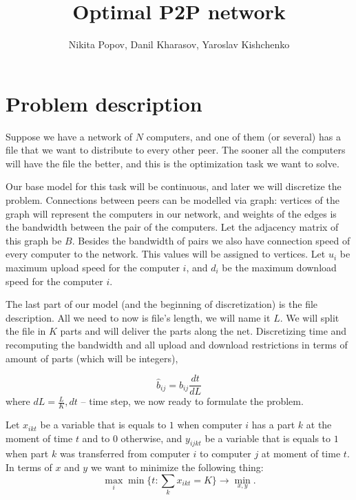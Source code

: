 \documentclass[10pt,a4paper]{article}
\title{Optimal P2P network}
\author{Nikita Popov, Danil Kharasov, Yaroslav Kishchenko}
\begin{document}
\maketitle
\section*{Problem description}

Suppose we have a network of $N$ computers, and one of them (or several) has a file that we want to distribute to every other peer. The sooner all the computers will have the file the better, and this is the optimization task we want to solve. 

Our base model for this task will be continuous, and later we will discretize the problem. Connections between peers can be modelled via graph: vertices of the graph will represent the computers in our network, and weights of the edges is the bandwidth between the pair of the computers. Let the adjacency matrix of this graph be $B$. Besides the bandwidth of pairs we also have connection speed of every computer to the network. This values will be assigned to vertices. Let $u_i$ be maximum upload speed for the computer $i$, and $d_i$ be the maximum download speed for the computer $i$. 

The last part of our model (and the beginning of discretization) is the file description. All we need to now is file's length, we will name it $L$. We will split the file in $K$ parts and will deliver the parts along the net. Discretizing time and recomputing the bandwidth and all upload and download restrictions in terms of amount of parts (which will be integers),

\begin{equation}
	\hat{b}_{ij} = b_{ij} \frac{dt}{dL}
\end{equation}
where $dL = \frac{L}{K}, dt$ -- time step, we now ready to formulate the problem.

Let $x_{ikt}$ be a variable that is equals to $1$ when computer $i$ has a part $k$ at the moment of time $t$ and to $0$ otherwise, and $y_{ijkt}$ be a variable that is equals to $1$ when part $k$ was transferred from computer $i$ to computer $j$ at moment of time $t$. In terms of $x$ and $y$ we want to minimize the following thing:
\begin{equation}
	\max_{i} \min \{t: \sum_k x_{ikt} = K \} \to \min_{x, y}.
\end{equation} 
\end{document}

